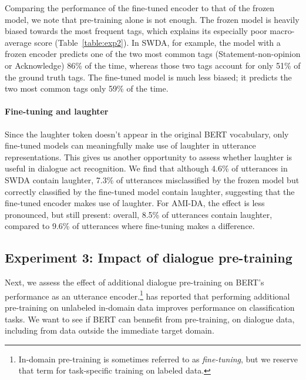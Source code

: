 \documentclass[11pt,a4paper]{article}
\begin{document}
Comparing the performance of the fine-tuned encoder to that of the frozen model, we note that pre-training alone is not enough.
The frozen model is heavily biased towards the most frequent tags, which explains its especially poor macro-average score (Table~\ref{table:exp2}).
In SWDA, for example, the model with a frozen encoder predicts one of the two most common tags (Statement-non-opinion or Acknowledge) 86\% of the time, whereas those two
tags account for only 51\% of the ground truth tags.
The fine-tuned model is much less biased; it predicts the two most common tags only 59\% of the time.




\paragraph{Fine-tuning and laughter}
Since the laughter token doesn't appear in the original BERT vocabulary, only fine-tuned models can meaningfully make use of laughter in utterance representations. 
This gives us another opportunity to assess whether laughter is useful in dialogue act recognition.
We find that although 4.6\% of utterances in SWDA contain laughter, 
7.3\% of utterances misclassified by the frozen model but correctly classified by the fine-tuned model contain laughter, 
suggesting that the fine-tuned encoder makes use of laughter. 
For AMI-DA, the effect is less pronounced, but still present: 
overall, 8.5\% of utterances contain laughter, 
compared to 9.6\% of utterances where fine-tuning makes a difference. 

\subsection{Experiment 3: Impact of dialogue pre-training} \label{sec:experiment3} %

Next, we assess the effect of additional dialogue pre-training on BERT's performance as an utterance encoder.\footnote{
In-domain pre-training is sometimes referred to as \textit{fine-tuning}, but we reserve that term for task-specific training on labeled data.}
\citet{sunHowFineTuneBERT2019} has reported that performing additional pre-training on unlabeled in-domain data improves performance on classification tasks. 
We want to see if BERT can bennefit from pre-training, on dialogue data, including from data outside the immediate target domain.
\end{document}

